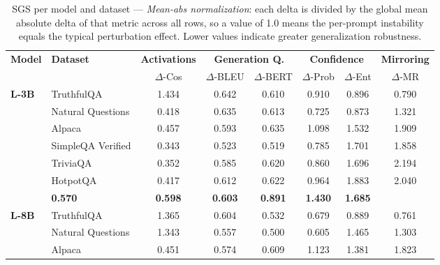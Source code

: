 \begin{table}[ht]
    \centering
    \tiny
    \caption{SGS per model and dataset --- \textit{Mean-abs normalization}: each delta is divided by the global mean absolute delta of that metric across all rows, so a value of 1.0 means the per-prompt instability equals the typical perturbation effect. Lower values indicate greater generalization robustness.}
    \label{tab:sgs_meanabs}
    \setlength{\tabcolsep}{3pt}
    \renewcommand{\arraystretch}{1.1}
    \begin{tabular}{ll cccccc}
        \toprule
        \textbf{Model} & \textbf{Dataset} & \textbf{Activations} & \multicolumn{2}{c}{\textbf{Generation Q.}} & \multicolumn{2}{c}{\textbf{Confidence}} & \textbf{Mirroring} \\
        \cmidrule(lr){3-3} \cmidrule(lr){4-5} \cmidrule(lr){6-7} \cmidrule(lr){8-8}
        & & $\Delta$-Cos & $\Delta$-BLEU & $\Delta$-BERT & $\Delta$-Prob & $\Delta$-Ent & $\Delta$-MR \\
        \midrule
        \multirow{6}{*}{\textbf{L-3B}}
        & TruthfulQA \cite{lin2022truthfulqa} & 1.434 & 0.642 & 0.610 & 0.910 & 0.896 & 0.790 \\
        & Natural Questions \cite{kwiatkowski2019natural} & 0.418 & 0.635 & 0.613 & 0.725 & 0.873 & 1.321 \\
        & Alpaca \cite{taori2023stanford-alpaca} & 0.457 & 0.593 & 0.635 & 1.098 & 1.532 & 1.909 \\
        & SimpleQA Verified \cite{haas_simpleqa_2026} & 0.343 & 0.523 & 0.519 & 0.785 & 1.701 & 1.858 \\
        & TriviaQA \cite{joshi2017triviaqa} & 0.352 & 0.585 & 0.620 & 0.860 & 1.696 & 2.194 \\
        & HotpotQA \cite{yang2018hotpotqa} & 0.417 & 0.612 & 0.622 & 0.964 & 1.883 & 2.040 \\
        \rowcolor[gray]{.95} \multicolumn{2}{r}{\textbf{Total SGS}} & \textbf{0.570} & \textbf{0.598} & \textbf{0.603} & \textbf{0.891} & \textbf{1.430} & \textbf{1.685} \\
        \midrule
        \multirow{6}{*}{\textbf{L-8B}}
        & TruthfulQA \cite{lin2022truthfulqa} & 1.365 & 0.604 & 0.532 & 0.679 & 0.889 & 0.761 \\
        & Natural Questions \cite{kwiatkowski2019natural} & 1.343 & 0.557 & 0.500 & 0.605 & 1.465 & 1.303 \\
        & Alpaca \cite{taori2023stanford-alpaca} & 0.451 & 0.574 & 0.609 & 1.123 & 1.381 & 1.823 \\

\end{tabular}
\end{table}
